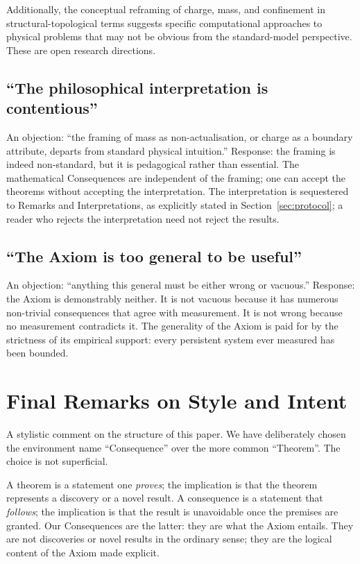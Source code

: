 \documentclass[11pt,twocolumn,a4paper]{article}
\theoremstyle{axiomstyle}
\theoremstyle{conseqstyle}
\theoremstyle{definition}
\theoremstyle{remark}
\begin{document}
Additionally, the conceptual reframing of charge, mass, and confinement in structural-topological terms suggests specific computational approaches to physical problems that may not be obvious from the standard-model perspective. These are open research directions.

\subsection{``The philosophical interpretation is contentious''}

An objection: ``the framing of mass as non-actualisation, or charge as a boundary attribute, departs from standard physical intuition.'' Response: the framing is indeed non-standard, but it is pedagogical rather than essential. The mathematical Consequences are independent of the framing; one can accept the theorems without accepting the interpretation. The interpretation is sequestered to Remarks and Interpretations, as explicitly stated in Section~\ref{sec:protocol}; a reader who rejects the interpretation need not reject the results.

\subsection{``The Axiom is too general to be useful''}

An objection: ``anything this general must be either wrong or vacuous.'' Response: the Axiom is demonstrably neither. It is not vacuous because it has numerous non-trivial consequences that agree with measurement. It is not wrong because no measurement contradicts it. The generality of the Axiom is paid for by the strictness of its empirical support: every persistent system ever measured has been bounded.

\section{Final Remarks on Style and Intent}
\label{app:style}

A stylistic comment on the structure of this paper. We have deliberately chosen the environment name ``Consequence'' over the more common ``Theorem''. The choice is not superficial.

A theorem is a statement one \emph{proves}; the implication is that the theorem represents a discovery or a novel result. A consequence is a statement that \emph{follows}; the implication is that the result is unavoidable once the premises are granted. Our Consequences are the latter: they are what the Axiom entails. They are not discoveries or novel results in the ordinary sense; they are the logical content of the Axiom made explicit.
\end{document}
